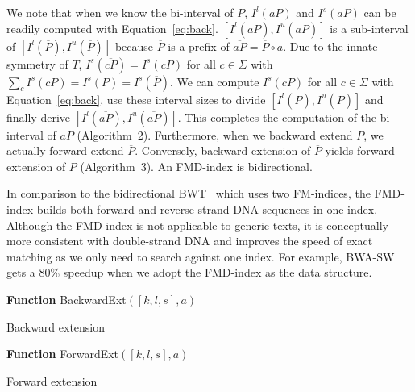 \documentclass{bioinfo}
\begin{document}
\begin{methods}
We note that when we know the bi-interval of $P$, $I^l(aP)$ and $I^s(aP)$ can
be readily computed with Equation~\eqref{eq:back}.
$[I^l(\overline{aP}),I^u(\overline{aP})]$ is a sub-interval of
$[I^l(\overline{P}),I^u(\overline{P})]$ because $\overline{P}$ is a prefix
of $\overline{aP}=\overline{P}\circ\overline{a}$. Due to the innate symmetry
of $T$, $I^s(\overline{cP})=I^s(cP)$ for all $c\in\Sigma$ with
$\sum_{c}I^s(cP)=I^s(P)=I^s(\overline{P})$. We can compute $I^s(cP)$ for all $c\in\Sigma$
with Equation~\eqref{eq:back}, use these interval sizes to divide
$[I^l(\overline{P}),I^u(\overline{P})]$ and finally derive
$[I^l(\overline{aP}),I^u(\overline{aP})]$.  This completes the computation of
the bi-interval of $aP$ (Algorithm~2).  Furthermore, when we backward extend
$P$, we actually forward extend $\overline{P}$.  Conversely, backward extension
of $\overline{P}$ yields forward extension of $P$ (Algorithm~3).
An FMD-index is bidirectional.

In comparison to the bidirectional BWT~\citep{Lam:2009fk} which uses two FM-indices,
the FMD-index builds both forward and reverse strand DNA sequences in one index.
Although the FMD-index is not applicable to generic texts, it is conceptually
more consistent with double-strand DNA and improves the speed of exact matching
as we only need to search against one index. For example,
BWA-SW~\citep{Li:2010fk} gets a 80\% speedup when we adopt the FMD-index as the
data structure.

\begin{algorithm}[h]
\DontPrintSemicolon
\footnotesize
{}
\BlankLine
\textbf{Function} {\sc BackwardExt}$([k,l,s],a)$
\caption{Backward extension}
\end{algorithm}

\begin{algorithm}[h]
\DontPrintSemicolon
\footnotesize
{}
\BlankLine
\textbf{Function} {\sc ForwardExt}$([k,l,s],a)$
\caption{Forward extension}
\end{algorithm}


\end{methods}
\end{document}
